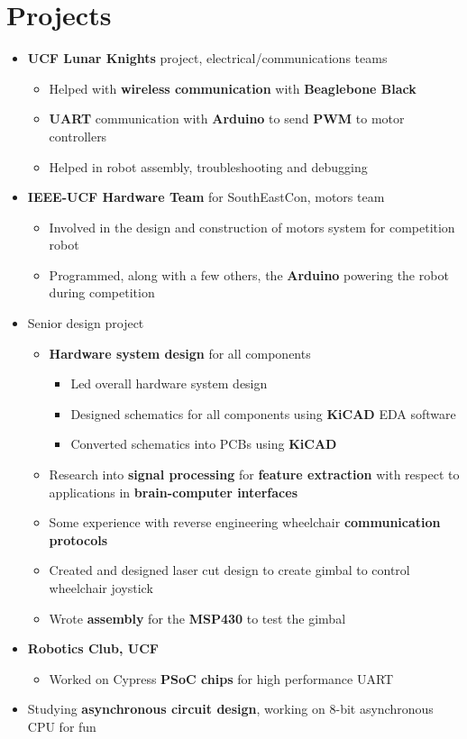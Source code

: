 \documentclass{my_resume}
\begin{document}
\section{Projects}
\begin{itemize}
    \item \textbf{UCF Lunar Knights} project, electrical/communications teams
        \begin{itemize}
            \item Helped with \textbf{wireless communication} with
                \textbf{Beaglebone Black}
            \item \textbf{UART} communication with \textbf{Arduino} to send
                \textbf{PWM} to motor controllers
            \item Helped in robot assembly, troubleshooting and debugging
        \end{itemize}
    \item \textbf{IEEE-UCF Hardware Team} for SouthEastCon, motors team
        \begin{itemize}
            \item Involved in the design and construction of motors system for
                competition robot
            \item Programmed, along with a few others, the \textbf{Arduino}
                powering the robot during competition
        \end{itemize}
    \item Senior design project
        \begin{itemize}
            \item \textbf{Hardware system design} for all components
            \begin{itemize}
                \item Led overall hardware system design
                \item Designed schematics for all components using \textbf{KiCAD} EDA software
                \item Converted schematics into PCBs using \textbf{KiCAD}
            \end{itemize}
            \item Research into \textbf{signal processing} for \textbf{feature extraction}
                with respect to applications in \textbf{brain-computer interfaces}
            \item Some experience with reverse engineering wheelchair 
                \textbf{communication protocols}
            \item Created and designed laser cut design to create gimbal to control wheelchair joystick
            \item Wrote \textbf{assembly} for the \textbf{MSP430} to test the gimbal
        \end{itemize}
    \item \textbf{Robotics Club, UCF}
        \begin{itemize}
            \item Worked on Cypress \textbf{PSoC chips} for high performance UART
        \end{itemize}
    \item Studying \textbf{asynchronous circuit design}, working on 8-bit asynchronous
        CPU for fun

\end{itemize}
\end{document}

